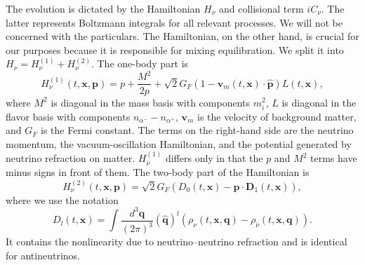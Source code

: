 \documentclass[aps,prl,twocolumn,groupedaddress]{revtex4-2}
\begin{document}
The evolution is dictated by the Hamiltonian $H_\nu$ and collisional term $iC_\nu$. The latter represents Boltzmann integrals for all relevant processes. We will not be concerned with the particulars. The Hamiltonian, on the other hand, is crucial for our purposes because it is responsible for mixing equilibration. We split it into $H_\nu = H_\nu^{(1)} + H_\nu^{(2)}$. The one-body part is
\begin{equation}
H_\nu^{(1)} \left( t, \boldsymbol{x}, \boldsymbol{p} \right) = p + \frac{M^2}{2 p} + \sqrt{2} G_F \left( 1 - \boldsymbol{v}_m ( t, \boldsymbol{x} ) \cdot \boldsymbol{\hat{p}} \right) L (t, \boldsymbol{x}), \label{eq:Hnu1}
\end{equation}
where $M^2$ is diagonal in the mass basis with components $m_i^2$, $L$ is diagonal in the flavor basis with components $n_{\alpha^-} - n_{\alpha^+}$, $\boldsymbol{v}_m$ is the velocity of background matter, and $G_F$ is the Fermi constant. The terms on the right-hand side are the neutrino momentum, the vacuum-oscillation Hamiltonian, and the potential generated by neutrino refraction on matter. $H_{\bar{\nu}}^{(1)}$ differs only in that the $p$ and $M^2$ terms have minus signs in front of them. The two-body part of the Hamiltonian is
\begin{equation}
H_{\nu}^{(2)} \left( t, \boldsymbol{x}, \boldsymbol{p} \right) = \sqrt{2} G_F \left( D_0 \left( t, \boldsymbol{x} \right) - \boldsymbol{\hat{p}} \cdot \boldsymbol{D}_1 \left( t, \boldsymbol{x} \right) \right), \label{eq:Hnu2}
\end{equation}
where we use the notation
\begin{equation}
D_l \left( t, \boldsymbol{x} \right) = \int \frac{d^3 \boldsymbol{q}}{(2\pi)^3} \left( \boldsymbol{\hat{q}} \right)^l \left( \rho_\nu \left( t, \boldsymbol{x}, \boldsymbol{q} \right) - \rho_{\bar{\nu}} \left( t, \boldsymbol{x}, \boldsymbol{q} \right) \right). \label{eq:Dmatrices}
\end{equation}
It contains the nonlinearity due to neutrino--neutrino refraction and is identical for antineutrinos.
\end{document}
